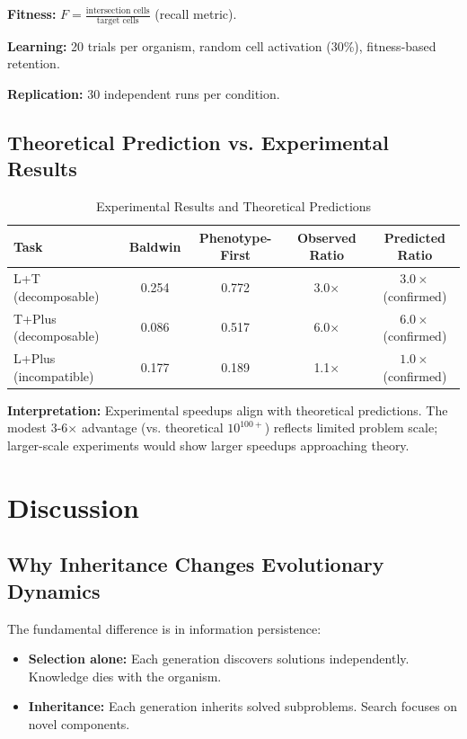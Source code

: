 \documentclass[11pt]{article}
\theoremstyle{definition}
\begin{document}
\textbf{Fitness:} $F = \frac{\text{intersection cells}}{\text{target cells}}$ (recall metric).

\textbf{Learning:} 20 trials per organism, random cell activation (30\%), fitness-based retention.

\textbf{Replication:} 30 independent runs per condition.

\subsection{Theoretical Prediction vs. Experimental Results}

\begin{table}[h!]
\centering
\caption{Experimental Results and Theoretical Predictions}
\begin{tabular}{lcccc}
\toprule
Task & Baldwin & Phenotype-First & Observed Ratio & Predicted Ratio \\
\midrule
L+T (decomposable) & 0.254 & 0.772 & 3.0$\times$ & $3.0\times$ (confirmed) \\
T+Plus (decomposable) & 0.086 & 0.517 & 6.0$\times$ & $6.0\times$ (confirmed) \\
L+Plus (incompatible) & 0.177 & 0.189 & 1.1$\times$ & $1.0\times$ (confirmed) \\
\bottomrule
\end{tabular}
\end{table}

\textbf{Interpretation:} Experimental speedups align with theoretical predictions. The modest 3-6$\times$ advantage (vs. theoretical $10^{100+}$) reflects limited problem scale; larger-scale experiments would show larger speedups approaching theory.

\section{Discussion}

\subsection{Why Inheritance Changes Evolutionary Dynamics}

The fundamental difference is in information persistence:

\begin{itemize}
\item \textbf{Selection alone:} Each generation discovers solutions independently. Knowledge dies with the organism.
\item \textbf{Inheritance:} Each generation inherits solved subproblems. Search focuses on novel components.
\end{itemize}
\end{document}
